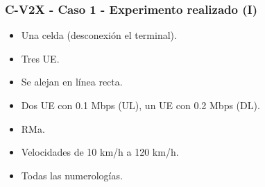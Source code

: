 \documentclass{beamer}
\begin{document}
%
%
%
%
%
%
%
%
%
%
%
%
%

\begin{frame}
\frametitle{C-V2X - Caso 1 - Experimento realizado (I)}

\begin{itemize}
\item Una celda (desconexión el terminal).
\item Tres UE.
\item Se alejan en línea recta.
\item Dos UE con 0.1 Mbps (UL), un UE con 0.2 Mbps (DL).
\item RMa.
\item Velocidades de 10 km/h a 120 km/h.
\item Todas las numerologías.
\end{itemize}
\end{frame}
\end{document}
